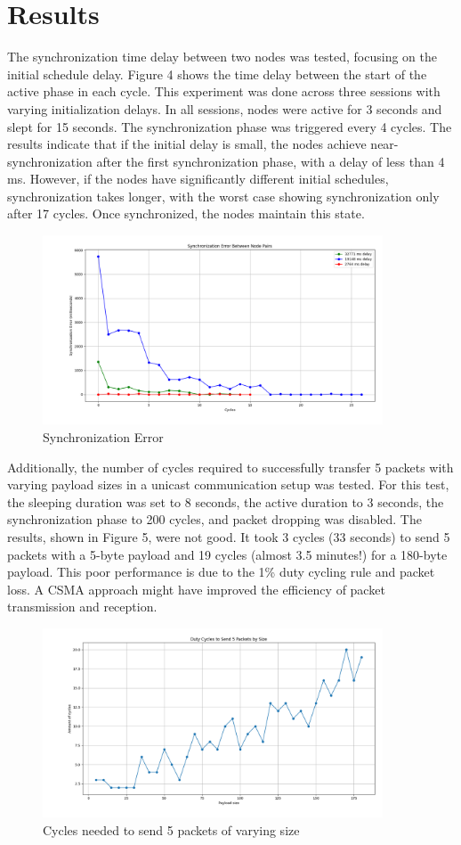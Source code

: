 \section*{Results}

The synchronization time delay between two nodes was tested, focusing on the initial schedule delay. Figure 4 shows the time delay between the start of the active phase in each cycle. This experiment was done across three sessions with varying initialization delays. In all sessions, nodes were active for 3 seconds and slept for 15 seconds. The synchronization phase was triggered every 4 cycles. The results indicate that if the initial delay is small, the nodes achieve near-synchronization after the first synchronization phase, with a delay of less than 4 ms. However, if the nodes have significantly different initial schedules, synchronization takes longer, with the worst case showing synchronization only after 17 cycles. Once synchronized, the nodes maintain this state.

\begin{figure}[h]
\centering
\includegraphics[width=0.9\textwidth]{figures/sync-error.png}
\caption{Synchronization Error}
\end{figure}

Additionally, the number of cycles required to successfully transfer 5 packets with varying payload sizes in a unicast communication setup was tested. For this test, the sleeping duration was set to 8 seconds, the active duration to 3 seconds, the synchronization phase to 200 cycles, and packet dropping was disabled. The results, shown in Figure 5, were not good. It took 3 cycles (33 seconds) to send 5 packets with a 5-byte payload and 19 cycles (almost 3.5 minutes!) for a 180-byte payload. This poor performance is due to the 1\% duty cycling rule and packet loss. A CSMA approach might have improved the efficiency of packet transmission and reception.

\begin{figure}[h]
\centering
\includegraphics[width=0.9\textwidth]{figures/packet-loss.png}
\caption{Cycles needed to send 5 packets of varying size}
\end{figure}
